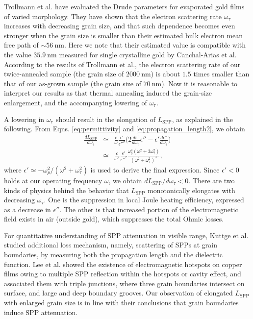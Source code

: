 \documentclass[aip,apl,reprint]{revtex4-1}
\begin{document}
Trollmann et al.\cite{Trollmann} have evaluated the Drude parameters for evaporated gold films of varied morphology. They have shown that the electron scattering rate $\omega_{\tau}$ increases with decreasing grain size, and that such dependence becomes even stronger when the grain size is smaller than their estimated bulk electron mean free path of $\sim 56\:\mathrm{nm}$. Here we note that their estimated value is compatible with the value $35.9 \:\mathrm{nm}$ measured for single crystalline gold by Canchal-Arias et al.\cite{Canchal-Arias} 
According to the results of Trollmann et al.,\cite{Trollmann} the electron scattering rate  of our twice-annealed sample (the grain size of $2000\:\mathrm{nm}$) is about $1.5$ times smaller than that of our as-grown sample (the grain size of $70\:\mathrm{nm}$). Now it is reasonable to interpret our results as that thermal annealing induced the grain-size enlargement, and the accompanying lowering of $\omega_{\mathrm{\tau}}$.

A lowering in $\omega_{\mathrm{\tau}}$ should result in the elongation of $L_{\mathrm{SPP}}$, as explained in the following. From Eqns. \ref{eq:permittivity} and \ref{eq:propagation_length2}, we obtain
\begin{eqnarray}
\frac{dL_{\mathrm{SPP}}}{d\omega_{\mathrm{\tau}}} &\simeq& \frac{c}{\omega} \frac{\epsilon'}{\epsilon''^2} \biggl( 2\frac{d\epsilon'}{d\omega_{\mathrm{\tau}}}\epsilon'' - \epsilon' \frac{d\epsilon''}{d\omega_{\mathrm{\tau}}} \biggr) \nonumber \\
&\simeq& \frac{c}{\omega^2} \frac{\epsilon'}{\epsilon''^2} \frac{\omega_p^4 (\omega^2+3\omega_{\mathrm{\tau}}^2)}{ (\omega^2+\omega_{\mathrm{\tau}}^2)^3},
\end{eqnarray}
where $\epsilon' \simeq -\omega_p^2/(\omega^2+\omega_{\tau}^2)$ is used to derive the final expression. Since $\epsilon'<0$ holds at our operating frequency $\omega$, we obtain $dL_{\mathrm{SPP}}/d\omega_{\tau} < 0$. 
There are two kinds of physics behind the behavior that $L_{\mathrm{SPP}}$ monotonically elongates with decreasing $\omega_{\tau}$. One is the suppression in local Joule heating efficiency, expressed as a decrease in $\epsilon''$. The other is that increased portion of the electromagnetic field exists in air (outside gold), which suppresses the total Ohmic losses.

For quantitative understanding of SPP attenuation in visible range, Kuttge et al.\cite{Kuttge} studied additional loss mechanism, namely, scattering of SPPs at grain boundaries, by measuring both the propagation length and the dielectric function. 
Lee et al.\cite{Lee} showed the existence of electromagnetic hotspots on copper films owing to multiple SPP reflection within the hotspots or cavity effect, and associated them with triple junctions, where three grain boundaries intersect on surface, and large and deep boundary grooves. Our observation of elongated $L_{\mathrm{SPP}}$ with enlarged grain size is in line with their conclusions that grain boundaries induce SPP attenuation.
 
\end{document}
